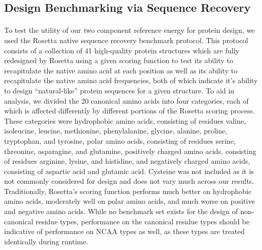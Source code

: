 \subsection{Design Benchmarking via Sequence Recovery}
\paragraph{}
To test the utility of our two component reference energy for protein design, we used the Rosetta native sequence recovery benchmark protocol\cite{leaver-fay_chapter_2013}.
This protocol consists of a collection of 41 high-quality protein structures which are fully redesigned by Rosetta using a given scoring function to test its ability to recapitulate the native amino acid at each position as well as its ability to recapitulate the native amino acid frequencies, both of which indicate it's ability to design ``natural-like'' protein sequences for a given structure.
To aid in analysis, we divided the 20 canonical amino acids into four categories, each of which is affected differently by different portions of the Rosetta scoring process.
These categories were hydrophobic amino acids, consisting of residues valine, isoleucine, leucine, methionine, phenylalanine, glycine, alanine, proline, tryptophan, and tyrosine, polar amino acids, consisting of residues serine, threonine, asparagine, and glutamine, positively charged amino acids, consisting of residues arginine, lysine, and histidine, and negatively charged amino acids, consisting of aspartic acid and glutamic acid.
Cysteine was not included as it is not commonly considered for design and does not vary much across our results.
Traditionally, Rosetta's scoring function performs much better on hydrophobic amino acids, moderately well on polar amino acids, and much worse on positive and negative amino acids.
While no benchmark set exists for the design of non-canonical residue types, performance on the canonical residue types should be indicative of performance on NCAA types as well, as these types are treated identically during runtime.


